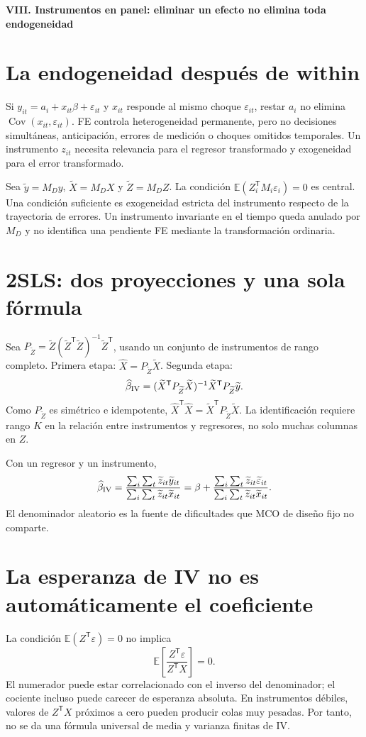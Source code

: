 \documentclass[11pt,a4paper]{article}
\newcommand{\E}{\mathbb E}
\newcommand{\T}{^{\mathsf T}}
\DeclareMathOperator{\Cov}{Cov}
\theoremstyle{definition}
\newcommand{\parte}[1]{\par\bigskip\Needspace{8\baselineskip}\begin{center}{\Large\bfseries\color{azul}#1}\end{center}}
\newcommand{\eps}{\varepsilon}
\begin{document}
\parte{VIII. Instrumentos en panel: eliminar un efecto no elimina toda endogeneidad}
\section{La endogeneidad después de within}
Si $y_{it}=a_i+x_{it}\beta+\eps_{it}$ y $x_{it}$ responde al mismo choque $\eps_{it}$, restar $a_i$ no elimina $\Cov(x_{it},\eps_{it})$.
FE controla heterogeneidad permanente, pero no decisiones simultáneas, anticipación, errores de medición o choques omitidos temporales.
Un instrumento $z_{it}$ necesita relevancia para el regresor transformado y exogeneidad para el error transformado.

Sea $\widetilde y=M_Dy$, $\widetilde X=M_DX$ y $\widetilde Z=M_DZ$. La condición
$\E(Z_i\T M_i\eps_i)=0$ es central. Una condición suficiente es exogeneidad estricta del instrumento respecto de la trayectoria de errores.
Un instrumento invariante en el tiempo queda anulado por $M_D$ y no identifica una pendiente FE mediante la transformación ordinaria.

\section{2SLS: dos proyecciones y una sola fórmula}
Sea $P_{\widetilde Z}=\widetilde Z(\widetilde Z\T\widetilde Z)^{-1}\widetilde Z\T$, usando un conjunto de instrumentos de rango completo.
Primera etapa: $\widehat X=P_{\widetilde Z}\widetilde X$.
Segunda etapa:
\[
\widehat\beta_{\rm IV}
=(\widetilde X\T P_{\widetilde Z}\widetilde X)^{-1}
\widetilde X\T P_{\widetilde Z}\widetilde y.
\]
Como $P_{\widetilde Z}$ es simétrico e idempotente,
$\widehat X\T\widehat X=\widetilde X\T P_{\widetilde Z}\widetilde X$.
La identificación requiere rango $K$ en la relación entre instrumentos y regresores, no solo muchas columnas en $Z$.

Con un regresor y un instrumento,
\[
\widehat\beta_{\rm IV}
=\frac{\sum_i\sum_t\widetilde z_{it}\widetilde y_{it}}
{\sum_i\sum_t\widetilde z_{it}\widetilde x_{it}}
=\beta+
\frac{\sum_i\sum_t\widetilde z_{it}\widetilde\eps_{it}}
{\sum_i\sum_t\widetilde z_{it}\widetilde x_{it}}.
\]
El denominador aleatorio es la fuente de dificultades que MCO de diseño fijo no comparte.

\section{La esperanza de IV no es automáticamente el coeficiente}
La condición $\E(Z\T\eps)=0$ no implica
\[
\E\left[\frac{Z\T\eps}{Z\T X}\right]=0.
\]
El numerador puede estar correlacionado con el inverso del denominador; el cociente incluso puede carecer de esperanza absoluta. En instrumentos débiles, valores de $Z\T X$ próximos a cero pueden producir colas muy pesadas.
Por tanto, no se da una fórmula universal de media y varianza finitas de IV.
\end{document}
